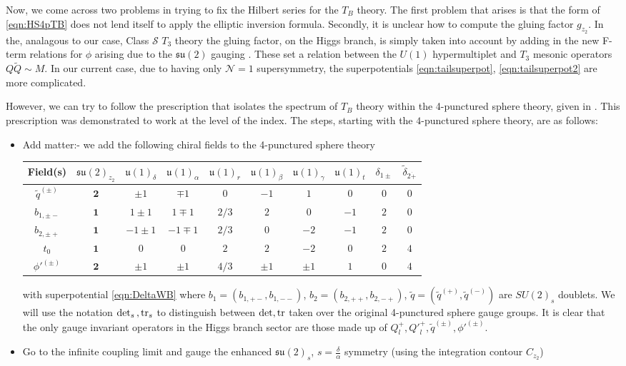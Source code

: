 \documentclass[main.tex]{subfiles}
\begin{document}
Now, we come across two problems in trying to fix the Hilbert series for the $T_B$ theory. The first problem that arises is that the form of \eqref{eqn:HS4pTB} does not lend itself to apply the elliptic inversion formula. Secondly, it is unclear how to compute the gluing factor $g_{z_2}$. In the, analagous to our case, Class $\mathcal{S}$ $T_3$ theory the gluing factor, on the Higgs branch, is simply taken into account by adding in the new F-term relations for $\phi$ arising due to the $\mathfrak{su}(2)$ gauging \cite{Benvenuti:2010pq}. These set a relation between the $U(1)$ hypermultiplet and $T_3$ mesonic operators $Q\widetilde{Q}\sim M$. In our current case, due to having only $\mathcal{N}=1$ supersymmetry, the superpotentials \eqref{eqn:tailsuperpot}, \eqref{eqn:tailsuperpot2} are more complicated.

However, we can try to follow the prescription that isolates the spectrum of $T_B$ theory within the 4-punctured sphere theory, given in \cite{Razamat:2016dpl,Gaiotto:2015usa}. This prescription was demonstrated to work at the level of the index.
The steps, starting with the $4$-punctured sphere theory, are as follows:
\begin{itemize}
\item {Add matter:- we add the following chiral fields to the 4-punctured sphere theory
\begin{table}[htb!]
\centering
\begin{tabular}{|c |c|c|c|c|c|c|c|c| c|} 
 \hline
 Field(s) &$\mathfrak{su}(2)_{z_2}$&$\mathfrak{u}(1)_{\delta}$&$\mathfrak{u}(1)_{\alpha}$&$\mathfrak{u}(1)_{r}$&$\mathfrak{u}(1)_{\beta}$&$\mathfrak{u}(1)_{\gamma}$&$\mathfrak{u}(1)_{t}$&$\delta_{1\pm}$&$\widetilde{\delta}_{2\dot+}$\\[2pt] 
  \hline\hline
$\widetilde{q}^{(\pm)}$&$\mathbf{2}$&$\pm1$&$\mp1$&$0$&$-1$&$1$&$0$&$0$&$0$\\
$b_{1,\pm-}$&$\mathbf{1}$&$1\pm1$&$1\mp1$&$2/3$&$2$&$0$&$-1$&$2$&$0$\\
$b_{2,\pm+}$&$\mathbf{1}$&$-1\pm1$&$-1\mp1$&$2/3$&$0$&$-2$&$-1$&$2$&$0$\\
$t_0$&$\mathbf{1}$&$0$&$0$&$2$&$2$&$-2$&$0$&$2$&$4$\\
${\phi'}^{(\pm)}$&$\mathbf{2}$&$\pm1$&$\pm1$&$4/3$&$\pm1$&$\pm1$&$1$&$0$&$4$\\\hline
\end{tabular}
\end{table}}
with superpotential \eqref{eqn:DeltaWB} where \newline$b_1=(b_{1,+-},b_{1,--})$, $b_2=(b_{2,++},b_{2,-+})$, $\widetilde{q}=(\widetilde{q}^{(+)},\widetilde{q}^{(-)})$ are $SU(2)_s$ doublets. We will use the notation $\det_s{}, \operatorname{tr}_s$ to distinguish between $\det,\operatorname{tr}$ taken over the original 4-punctured sphere gauge groups.
It is clear that the only gauge invariant operators in the Higgs branch sector are those made up of $Q_{l}^+,{Q'}_{l}^+,\widetilde{q}^{(\pm)},{\phi'}^{(\pm)}$. 
\item Go to the infinite coupling limit and gauge the enhanced $\mathfrak{su}(2)_s$, $s=\frac{\delta}{\alpha}$ symmetry (using the integration contour $C_{z_2}$)
\end{itemize}
\end{document}
